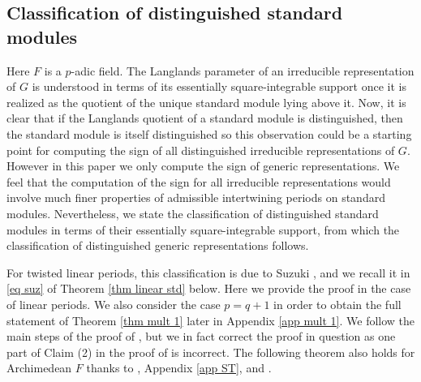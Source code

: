 \documentclass[11pt,letterpaper]{amsart}
\theoremstyle{plain}
\numberwithin{equation}{section}
\begin{document}
\subsection{Classification of distinguished standard modules}\label{sec dist stand}

Here $F$ is a $p$-adic field. The Langlands parameter of an irreducible representation of $G$ is understood in terms of its essentially square-integrable support once it is realized as the quotient of the unique standard module lying above it. Now, it is clear that if the Langlands quotient of a standard module is distinguished, then the standard module is itself distinguished so this observation could be a starting point for computing the sign of all distinguished irreducible representations of $G$. However in this paper  we only compute the sign of generic representations. We feel that the computation of the sign for all irreducible representations would involve much finer properties of admissible intertwining periods on standard modules. Nevertheless, we state the classification of distinguished standard modules in terms of their essentially square-integrable support, from which the classification of distinguished generic representations follows. 

For twisted linear periods, this classification is due to Suzuki \cite[Theorem 1.3]{SuzJNT}, and we recall it in \eqref{eq suz} of Theorem \ref{thm linear std} below. Here we provide the proof in the case of linear periods. We also consider the case $p=q+1$ in order to obtain the 
full statement of Theorem \ref{thm mult 1} later in Appendix \ref{app mult 1}. We follow the main  steps of the proof of \cite[Theorems 3.13 and 3.14]{MatCRELLE}, but we in fact correct the proof in question as one part of Claim (2) in the proof of \cite[Theorems 3.14]{MatCRELLE} is incorrect. The following theorem also holds for Archimedean $F$ thanks to \cite{ST}, Appendix \ref{app ST}, and \cite[Theorem 5.4]{MOY}.  
\end{document}
